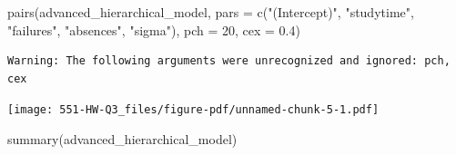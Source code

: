 \documentclass[
  10pt,
]{article}
\newenvironment{Shaded}{\begin{snugshade}}{\end{snugshade}}
\newcommand{\AttributeTok}[1]{\textcolor[rgb]{0.40,0.45,0.13}{#1}}
\newcommand{\DecValTok}[1]{\textcolor[rgb]{0.68,0.00,0.00}{#1}}
\newcommand{\FloatTok}[1]{\textcolor[rgb]{0.68,0.00,0.00}{#1}}
\newcommand{\FunctionTok}[1]{\textcolor[rgb]{0.28,0.35,0.67}{#1}}
\newcommand{\NormalTok}[1]{\textcolor[rgb]{0.00,0.23,0.31}{#1}}
\newcommand{\StringTok}[1]{\textcolor[rgb]{0.13,0.47,0.30}{#1}}
\begin{document}
\begin{Shaded}
\begin{Highlighting}[]
\FunctionTok{pairs}\NormalTok{(advanced\_hierarchical\_model, }
      \AttributeTok{pars =} \FunctionTok{c}\NormalTok{(}\StringTok{"(Intercept)"}\NormalTok{, }\StringTok{"studytime"}\NormalTok{, }\StringTok{"failures"}\NormalTok{, }\StringTok{"absences"}\NormalTok{, }\StringTok{"sigma"}\NormalTok{), }
      \AttributeTok{pch =} \DecValTok{20}\NormalTok{,}
      \AttributeTok{cex =} \FloatTok{0.4}\NormalTok{)}
\end{Highlighting}
\end{Shaded}

\begin{verbatim}
Warning: The following arguments were unrecognized and ignored: pch, cex
\end{verbatim}

\texttt{[image: 551-HW-Q3\_files/figure-pdf/unnamed-chunk-5-1.pdf]}

\begin{Shaded}
\begin{Highlighting}[]
\FunctionTok{summary}\NormalTok{(advanced\_hierarchical\_model)}
\end{Highlighting}
\end{Shaded}
\end{document}
